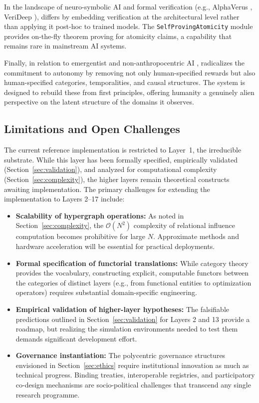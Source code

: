 In the landscape of neuro-symbolic AI and formal verification (e.g., AlphaVerus \cite{wang2023}, VeriDeep \cite{chen2024}), \Apeiron{} differs by embedding verification at the architectural level rather than applying it post-hoc to trained models. The \texttt{SelfProvingAtomicity} module provides on-the-fly theorem proving for atomicity claims, a capability that remains rare in mainstream AI systems.

Finally, in relation to emergentist and non-anthropocentric AI \cite{thompson2007, stanley2019}, \Apeiron{} radicalizes the commitment to autonomy by removing not only human-specified rewards but also human-specified categories, temporalities, and causal structures. The system is designed to rebuild these from first principles, offering humanity a genuinely alien perspective on the latent structure of the domains it observes.

\subsection{Limitations and Open Challenges}

The current reference implementation is restricted to Layer~1, the irreducible substrate. While this layer has been formally specified, empirically validated (Section~\ref{sec:validation}), and analyzed for computational complexity (Section~\ref{sec:complexity}), the higher layers remain theoretical constructs awaiting implementation. The primary challenges for extending the implementation to Layers 2--17 include:

\begin{itemize}
    \item \textbf{Scalability of hypergraph operations:} As noted in Section~\ref{sec:complexity}, the $\mathcal{O}(N^2)$ complexity of relational influence computation becomes prohibitive for large $N$. Approximate methods and hardware acceleration will be essential for practical deployments.
    \item \textbf{Formal specification of functorial translations:} While category theory provides the vocabulary, constructing explicit, computable functors between the categories of distinct layers (e.g., from functional entities to optimization operators) requires substantial domain-specific engineering.
    \item \textbf{Empirical validation of higher-layer hypotheses:} The falsifiable predictions outlined in Section~\ref{sec:validation} for Layers 2 and 13 provide a roadmap, but realizing the simulation environments needed to test them demands significant development effort.
    \item \textbf{Governance instantiation:} The polycentric governance structures envisioned in Section~\ref{sec:ethics} require institutional innovation as much as technical progress. Binding treaties, interoperable registries, and participatory co-design mechanisms are socio-political challenges that transcend any single research programme.
\end{itemize}

